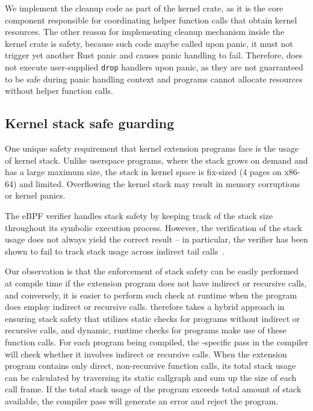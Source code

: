 
We implement the cleanup code as part of the \projname{} kernel crate, as it
    is the core component responsible for coordinating helper function calls
    that obtain kernel resources.
The other reason for implementing cleanup mechanism inside the kernel crate is
    safety, because such code maybe called upon panic, it must not trigger yet
    another Rust panic and causes panic handling to fail.
Therefore, \projname{} does not execute user-supplied \texttt{drop} handlers
    upon panic, as they are not guarranteed to be safe during panic handling
    context and programs cannot allocate resources without helper function
    calls.

\subsection{Kernel stack safe guarding}
\label{principle:stack}
One unique safety requirement that kernel extension programs face is the
    usage of kernel stack.
Unlike userspace programs, where the stack grows on demand and has a large
    maximum size,
    the stack in kernel space is fix-sized (4 pages on x86-64) and limited.
Overflowing the kernel stack may result in memory corruptions or kernel panics.

The eBPF verifier handles stack safety by keeping track of the stack size
    throughout its symbolic execution process.
However, the verification of the stack usage does not always yield the correct
    result -- in particular, the verifier has been shown to fail to track stack
    usage across indirect tail calls~\cite{ebpf-stackoverflow}.

Our observation is that the enforcement of stack safety can be easily performed
    at compile time if the extension program does not have indirect or
    recursive calls, and conversely, it is easier to perform such check at
    runtime when the program does employ indirect or recursive calls.
\projname{} therefore takes a hybrid approach in ensuring stack safety that
    utilizes static checks for programs without indirect or recursive calls,
    and dynamic, runtime checks for programs make use of these function calls.
For each program being compiled, the \projname{}-specific pass in the compiler
    will check whether it involves indirect or recursive calls.
When the extension program contains only direct, non-recursive function calls,
    its total stack usage can be calculated by traversing its static callgraph
    and sum up the size of each call frame.
If the total stack usage of the program exceeds total amount of stack
    available, the \projname{} compiler pass will generate an error and reject
    the program.


